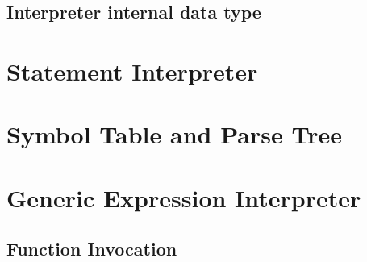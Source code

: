\subsection{Interpreter internal data type}

\section{Statement Interpreter}

\section{Symbol Table and Parse Tree}


\section{Generic Expression Interpreter}

\subsection{Function Invocation}

